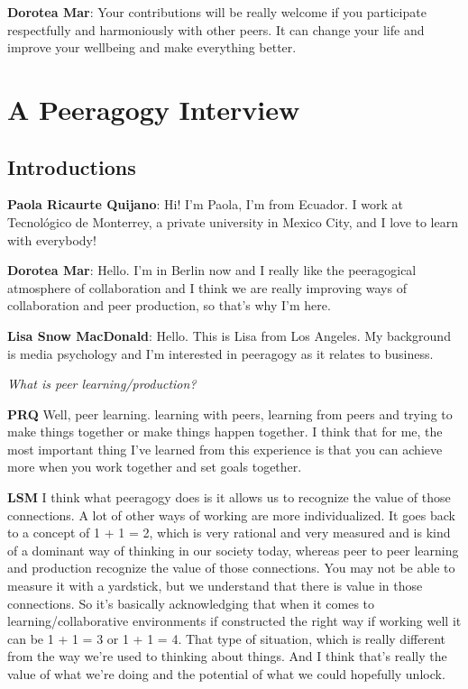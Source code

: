 \textbf{Dorotea Mar}: Your contributions will be really welcome if you
participate respectfully and harmoniously with other peers. It can
change your life and improve your well­being and make everything better.

\section{A Peeragogy Interview}\label{a-peeragogy-interview}

\subsection{Introductions}\label{introductions}

\textbf{Paola Ricaurte Quijano}: Hi! I'm Paola, I'm from Ecuador. I work
at Tecnológico de Monterrey, a private university in Mexico City, and I
love to learn with everybody!

\textbf{Dorotea Mar}: Hello. I'm in Berlin now and I really like the
peeragogical atmosphere of collaboration and I think we are really
improving ways of collaboration and peer production, so that's why I'm
here.

\textbf{Lisa Snow MacDonald}: Hello. This is Lisa from Los Angeles. My
background is media psychology and I'm interested in peeragogy as it
relates to business.

\emph{What is peer learning/production?}

\textbf{PRQ} Well, peer learning. learning with peers, learning from
peers and trying to make things together or make things happen together.
I think that for me, the most important thing I've learned from this
experience is that you can achieve more when you work together and set
goals together.

\textbf{LSM} I think what peeragogy does is it allows us to recognize
the value of those connections. A lot of other ways of working are more
individualized. It goes back to a concept of 1 + 1 = 2, which is very
rational and very measured and is kind of a dominant way of thinking in
our society today, whereas peer to peer learning and production
recognize the value of those connections. You may not be able to measure
it with a yardstick, but we understand that there is value in those
connections. So it's basically acknowledging that when it comes to
learning/collaborative environments if constructed the right way if
working well it can be 1 + 1 = 3 or 1 + 1 = 4. That type of situation,
which is really different from the way we're used to thinking about
things. And I think that's really the value of what we're doing and the
potential of what we could hopefully unlock.

